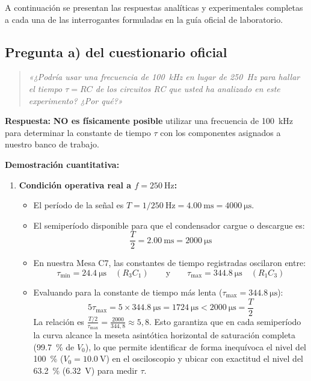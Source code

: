 \begin{appendices}
A continuación se presentan las respuestas analíticas y experimentales completas a cada una de las interrogantes formuladas en la guía oficial de laboratorio.

\subsection{Pregunta a) del cuestionario oficial}
\begin{quote}
    \textit{«¿Podría usar una frecuencia de \qty{100}{\kilo\hertz} en lugar de \qty{250}{\hertz} para hallar el tiempo $\tau = RC$ de los circuitos RC que usted ha analizado en este experimento? ¿Por qué?»}
\end{quote}

\textbf{Respuesta:} \textbf{NO es físicamente posible} utilizar una frecuencia de \qty{100}{\kilo\hertz} para determinar la constante de tiempo $\tau$ con los componentes asignados a nuestro banco de trabajo.

\textbf{Demostración cuantitativa:}
\begin{enumerate}
    \item \textbf{Condición operativa real a $f = \qty{250}{\hertz}$:}
    \begin{itemize}
        \item El período de la señal es $T = 1 / \qty{250}{\hertz} = \qty{4,00}{\milli\second} = \qty{4000}{\micro\second}$.
        \item El semiperíodo disponible para que el condensador cargue o descargue es:
        \begin{equation*}
            \frac{T}{2} = \qty{2,00}{\milli\second} = \qty{2000}{\micro\second}
        \end{equation*}
        \item En nuestra Mesa C7, las constantes de tiempo registradas oscilaron entre:
        \begin{equation*}
            \tau_{\min} = \qty{24,4}{\micro\second} \quad (R_3 C_1) \qquad \text{y} \qquad \tau_{\max} = \qty{344,8}{\micro\second} \quad (R_1 C_3)
        \end{equation*}
        \item Evaluando para la constante de tiempo más lenta ($\tau_{\max} = \qty{344,8}{\micro\second}$):
        \begin{equation*}
            5\tau_{\max} = 5 \times \qty{344,8}{\micro\second} = \qty{1724}{\micro\second} < \qty{2000}{\micro\second} = \frac{T}{2}
        \end{equation*}
        La relación es $\frac{T/2}{\tau_{\max}} = \frac{2000}{344{,}8} \approx 5{,}8$. Esto garantiza que en cada semiperíodo la curva alcance la meseta asintótica horizontal de saturación completa (\qty{99,7}{\percent} de $V_0$), lo que permite identificar de forma inequívoca el nivel del \qty{100}{\percent} ($V_0 = \qty{10,0}{\volt}$) en el osciloscopio y ubicar con exactitud el nivel del \qty{63,2}{\percent} (\qty{6,32}{\volt}) para medir $\tau$.
    \end{itemize}
    

\end{enumerate}
\end{appendices}
